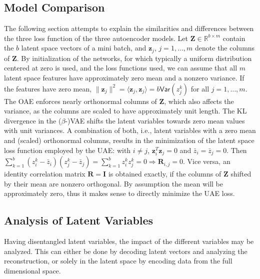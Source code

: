 \subsection{Model Comparison}
The following section attempts to explain the similarities and differences between the three loss function of the three autoencoder models.
Let $\mathbf{Z}\in\mathbb{R}^{b\times m}$ contain the $b$ latent space vectors of a mini batch, and $\mathbf{z}_j$, $j=1,\ldots,m$ denote the columns of $\mathbf{Z}$. By initialization of the networks, for which typically a uniform distribution centered at zero is used, and the loss functions used, we can assume that all $m$ latent space features have approximately zero mean and a nonzero variance. If the features have zero mean, $\|\mathbf{z}_j\|^2=\langle\mathbf{z}_j,\mathbf{z}_j\rangle=b\textsf{Var}(z_j^k)$ for all $j=1,\ldots,m$.
The OAE enforces nearly orthonormal columns of $\mathbf{Z}$, which also affects the variance, as the columns are scaled to have approximately unit length.
The KL divergence in the ($\beta$-)VAE shifts the latent variables towards zero mean values with unit variances.
A combination of both, i.e., latent variables with a zero mean and (scaled) orthonormal columns, results in the minimization of the latent space loss function employed by the UAE:
with $i\neq j$, $\mathbf{z}_i^T\mathbf{z}_j=0$ and $\bar{z}_{i}=\bar{z}_{j}=0$. Then $\sum^b_{k=1}(z_i^k-\bar{z}_{i})(z_j^k-\bar{z}_j) = \sum^b_{k=1}z_i^kz_j^k=0 \Rightarrow \mathbf{R}_{i,j}=0$.
Vice versa, an identity correlation matrix $\mathbf{R}=\mathbf{I}$ is obtained exactly, if the columns of $\mathbf{Z}$ shifted by their mean are nonzero orthogonal. By assumption the mean will be approximately zero, thus it makes sense to directly minimize the UAE loss.

\subsection{Analysis of Latent Variables}
Having disentangled latent variables, the impact of the different variables may be analyzed. This can either be done by decoding latent vectors and analyzing the reconstruction, or solely in the latent space by encoding data from the full dimensional space. 

